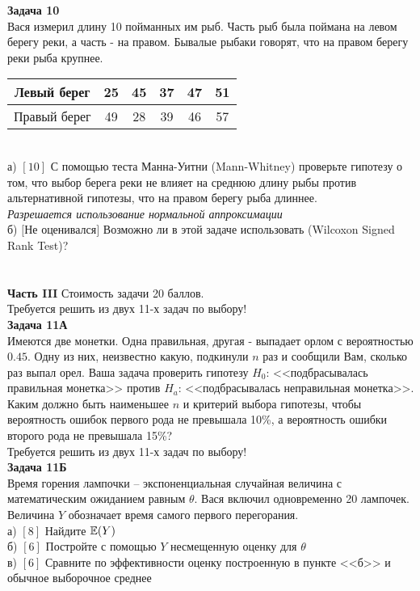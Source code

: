 \documentclass[pdftex,12pt,a4paper]{article}
\begin{document}
\textbf{Задача 10} \\ %
Вася измерил длину 10 пойманных им рыб. Часть рыб была поймана на
левом берегу реки, а часть - на правом. Бывалые рыбаки говорят,
что на правом берегу реки рыба крупнее. \\
\begin{tabular}{|c|c|c|c|c|c|}
  \hline
  Левый берег & 25 & 45 & 37 & 47 & 51   \\
  \hline
  Правый берег & 49 & 28 & 39 & 46 & 57   \\
  \hline
\end{tabular} \\
а) $[10]$ С помощью теста Манна-Уитни (Mann-Whitney) проверьте
гипотезу о том, что выбор берега реки не влияет на среднюю длину
рыбы против
альтернативной гипотезы, что на правом берегу рыба длиннее. \\
\emph{Разрешается использование нормальной аппроксимации} \\
б) $[$Не оценивался$]$ Возможно ли в этой задаче использовать
(Wilcoxon Signed Rank
Test)? \\ \\ \\


\textbf{Часть III} Стоимость задачи 20 баллов. \\

Требуется решить \textbf{} из двух 11-х задач по
выбору! \\


\textbf{Задача 11А} \\
Имеются две монетки. Одна правильная, другая - выпадает орлом с
вероятностью $0.45$. Одну из них, неизвестно какую, подкинули $n$
раз и сообщили Вам, сколько раз выпал орел. Ваша задача проверить
гипотезу $H_{0}$: <<подбрасывалась правильная монетка>> против
$H_{a}$:
<<подбрасывалась неправильная монетка>>. \\
Каким должно быть наименьшее $n$ и критерий выбора гипотезы, чтобы
вероятность ошибок первого рода не превышала 10\%, а вероятность
ошибки второго рода не превышала 15\%? \\

Требуется решить \textbf{} из двух 11-х задач по
выбору! \\

\textbf{Задача 11Б} \\
Время горения лампочки – экспоненциальная случайная величина с
математическим ожиданием равным $\theta $. Вася включил
одновременно 20 лампочек. Величина  $Y$ обозначает время самого
первого перегорания. \\
а) $[8]$ Найдите $\mathbb{E}(Y)$ \\
б) $[6]$ Постройте с помощью  $Y$ несмещенную оценку для  $\theta$ \\
в) $[6]$ Сравните по эффективности оценку построенную в пункте
<<б>> и
обычное выборочное среднее \\
\end{document}
